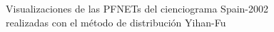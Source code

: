 \documentclass[10pt,a4paper,spanish]{article}
\numberwithin{equation}{section} %
\numberwithin{figure}{section} %
\numberwithin{table}{section} %
\begin{document}
\begin{figure}[!h]
{{            \label{q4yfsp}
        }
    }
    \caption{Visualizaciones de las PFNETs del cienciograma Spain-2002 realizadas con el método de distribución Yihan-Fu}
    \label{yfsp}
\end{figure}
\end{document}
